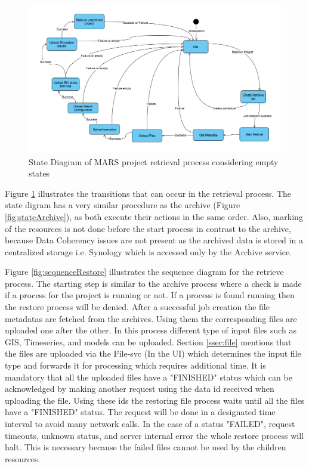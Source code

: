     \begin{figure}[H]
        \centering \includegraphics[scale=0.45]{grafiken/stateRestore.png}
        \caption{State Diagram of MARS project retrieval process considering empty states}
        \label{fig:stateRestore}
    \end{figure}

    Figure \ref{fig:stateRestore} illustrates the transitions that can occur in the retrieval process. The state digram has a very similar procedure as the
    archive (Figure \ref{fig:stateArchive}), as both execute their actions in the same order. 
    Also, marking of the resources is not done before the start process in contrast to the archive, because Data Coherency issues are not present as the archived
    data is stored in a centralized storage i.e. Synology which is accessed only by the Archive service.   

Figure \ref{fig:sequenceRestore} illustrates the sequence diagram for the retrieve process. The starting step is similar to the archive process where a
check is made if a process for the project is running or not. If a process is found running then the restore process will be denied. After a
successful job creation the file metadatas are fetched from the archives. Using them the corresponding files are uploaded one after the other. 
In this process different type of input files such as GIS, Timeseries, and models can be uploaded. Section \ref{ssec:file} mentions that the files are uploaded via
the File-svc (In the UI) which determines the input file type and forwards it for processing which requires additional time.
It is mandatory
that all the uploaded files have a "FINISHED" status which can be acknowledged by making another request using the data id received when uploading the file. 
Using these ids the restoring file process waits until all the files have a "FINISHED" status. The request will be done in a designated time interval to avoid many
network calls. In the case of a status "FAILED", request timeouts, unknown status, and server internal error the whole restore process will halt. 
This is necessary because the failed files cannot be used by the children resources.

